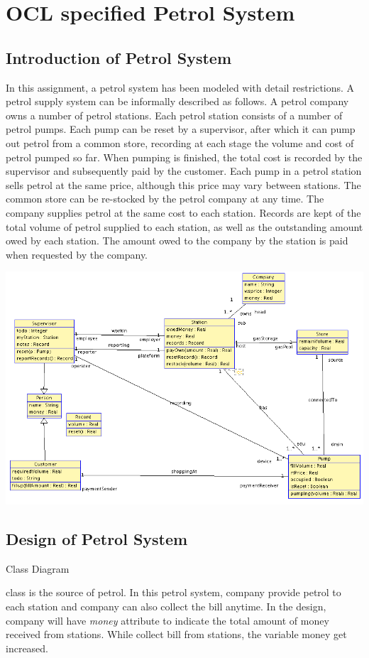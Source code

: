 \section{OCL specified Petrol System}
\subsection{Introduction of Petrol System}
In this assignment, a petrol system has been modeled with detail restrictions. 
A petrol supply system can be informally described as follows. A petrol company owns a number of petrol stations. Each petrol station consists of a number of petrol pumps. Each pump can be reset by a supervisor, after which it can pump out petrol from a common store, recording at each stage the volume and cost of petrol pumped so far. When pumping is finished, the total cost is recorded by the supervisor and subsequently paid by the customer. Each pump in a petrol station sells petrol at the same price, although this price may vary between stations. The common store can be re-stocked by the petrol company at any time. The company supplies petrol at the same cost to each station. Records are kept of the total volume of petrol supplied to each station, as well as the outstanding amount owed by each station. The amount owed to the company by the station is paid when requested by the company.\cite{li2013object}
\begin{center}
    \includegraphics[angle=0,width=1\linewidth]{classDiag.png}
    \subsection{Design of Petrol System}
    \caption{Class Diagram}
    \label{fig:my_label}
\end{center}
 class is the source of petrol. In this petrol system, company provide petrol to each station and company can also collect the bill anytime. In the design, company will have \textit{money} attribute to indicate the total amount of money received from stations. While collect bill from stations, the variable money get increased. 

